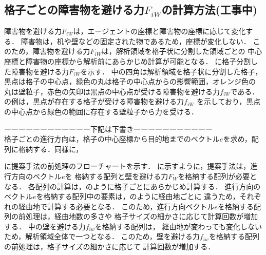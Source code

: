 

\subsection{格子ごとの障害物を避ける力$F_{iW}$の計算方法(工事中)}
障害物を避ける力$F_{iW}$は，エージェントの座標と障害物の座標に応じて変化する．
障害物は，机や壁などの固定された物であるため，座標が変化しない．
このため，障害物を避ける力$F_{iW}$は，解析領域を格子状に分割した領域ごとの
中心座標と障害物の座標から解析前にあらかじめ計算が可能となる．
に格子分割した障害物を避ける力$F_{iW}$を示す．
中の四角は解析領域を格子状に分割した格子，
黒点は格子の中心点，緑色の丸は格子の中心点からの影響範囲，オレンジ色の
丸は壁粒子，赤色の矢印は黒点の中心点が受ける障害物を避ける力$f_{iW}$である．
の例は，黒点が存在する格子が受ける障害物を避ける力$f_{iW}$
を示しており，黒点の中心点から緑色の範囲に存在する壁粒子から力を受ける．


ーーーーーーーーーーーー下記は下書きーーーーーーーーーーー\\

格子ごとの進行方向は，格子の中心座標から目的地までのベクトル$e$を求め，配列に格納する．同様に，


に提案手法の前処理のフローチャートを示す．
に示すように，提案手法は，進行方向のベクトル$e$を
格納する配列と壁を避ける力$F_W$を格納する配列が必要となる．
各配列の計算は，のように格子ごとにあらかじめ計算する．
進行方向のベクトル$e$を格納する配列中の要素は，のように経由地ごとに
違うため，それぞれの経由地で計算する必要となる．
このため，進行方向ベクトル$e$を格納する配列の前処理は，経由地数の多さや
格子サイズの細かさに応じて計算回数が増加する．
中の壁を避ける力$f_{iw}$を格納する配列は，
経由地が変わっても変化しないため，解析領域全体で一つとなる．
このため，壁を避ける力$f_{iw}$を格納する配列の前処理は，格子サイズの細かさに応じて
計算回数が増加する．

